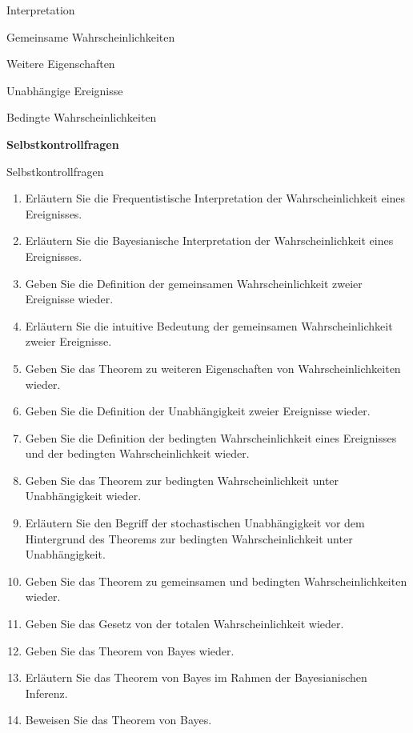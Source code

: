 \documentclass[
  8pt,
  ignorenonframetext,
]{beamer}
\begin{document}
\begin{frame}{}
\protect\hypertarget{section-10}{}
\vfill
\large

Interpretation

Gemeinsame Wahrscheinlichkeiten

Weitere Eigenschaften

Unabhängige Ereignisse

Bedingte Wahrscheinlichkeiten

\textbf{Selbstkontrollfragen} \vfill
\end{frame}

\begin{frame}{Selbstkontrollfragen}
\protect\hypertarget{selbstkontrollfragen}{}
\footnotesize
\begin{enumerate}
\item Erläutern Sie die Frequentistische Interpretation der Wahrscheinlichkeit eines Ereignisses.
\item Erläutern Sie die Bayesianische Interpretation der Wahrscheinlichkeit eines Ereignisses.
\item Geben Sie die Definition der gemeinsamen Wahrscheinlichkeit zweier Ereignisse wieder.
\item Erläutern Sie die intuitive Bedeutung der gemeinsamen Wahrscheinlichkeit zweier Ereignisse.
\item Geben Sie das Theorem zu weiteren Eigenschaften von Wahrscheinlichkeiten wieder.
\item Geben Sie die Definition der Unabhängigkeit zweier Ereignisse wieder.
\item Geben Sie die Definition der bedingten Wahrscheinlichkeit eines Ereignisses und der bedingten Wahrscheinlichkeit wieder.
\item Geben Sie das Theorem zur bedingten Wahrscheinlichkeit unter Unabhängigkeit wieder.
\item Erläutern Sie den Begriff der stochastischen Unabhängigkeit vor dem Hintergrund des Theorems zur bedingten Wahrscheinlichkeit unter Unabhängigkeit.
\item Geben Sie das Theorem zu gemeinsamen und bedingten Wahrscheinlichkeiten wieder.
\item Geben Sie das Gesetz von der totalen Wahrscheinlichkeit wieder.
\item Geben Sie das Theorem von Bayes wieder.
\item Erläutern Sie das Theorem von Bayes im Rahmen der Bayesianischen Inferenz.
\item Beweisen Sie das Theorem von Bayes.
\end{enumerate}
\end{frame}
\end{document}
